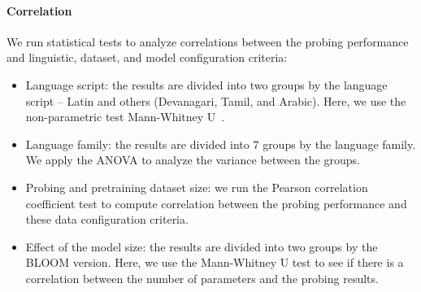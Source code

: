 \documentclass[twoside,11pt]{article}
\begin{document}
\paragraph{Correlation} We run statistical tests to analyze correlations between the probing performance and linguistic, dataset, and model configuration criteria:
\begin{itemize}
    \item Language script: the results are divided into two groups by the language script -- Latin and others (Devanagari, Tamil, and Arabic). Here, we use the non-parametric test Mann-Whitney U~\citep{mann1947controlling}.
    \item Language family: the results are divided into $7$ groups by the language family. We apply the ANOVA to analyze the variance between the groups.
    \item Probing and pretraining dataset size: we run the Pearson correlation coefficient test \citep{pearson1895vii} to compute correlation between the probing performance and these data configuration criteria.
    \item Effect of the model size: the results are divided into two groups by the BLOOM version. Here, we use the Mann-Whitney U test to see if there is a correlation between the number of parameters and the probing results.
\end{itemize}
\end{document}
